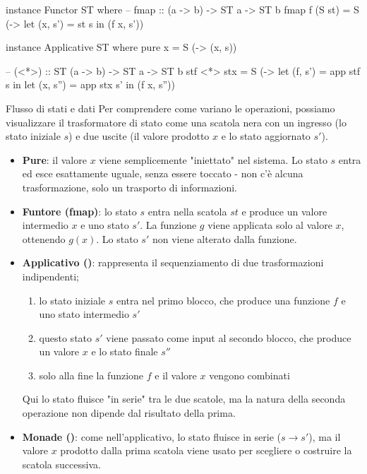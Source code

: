 \begin{haskellbox}{}
instance Functor ST where
    -- fmap :: (a -> b) -> ST a -> ST b
    fmap f (S st) = S (\s -> 
        let (x, s') = st s 
        in (f x, s'))
\end{haskellbox}

\begin{haskellbox}{}
instance Applicative ST where
    pure x = S (\s -> (x, s))

    -- (<*>) :: ST (a -> b) -> ST a -> ST b
    stf <*> stx = S (\s ->
        let (f, s')  = app stf s in
        let (x, s'') = app stx s' in
        (f x, s''))
\end{haskellbox}

\begin{gframe}{Flusso di stati e dati}
Per comprendere come variano le operazioni, possiamo visualizzare il trasformatore di stato come una scatola nera con un ingresso (lo stato iniziale $s$) e due uscite (il valore prodotto $x$ e lo stato aggiornato $s'$).

\begin{itemize}
    \item \textbf{Pure}: il valore $x$ viene semplicemente "iniettato" nel sistema. Lo stato $s$ entra ed esce esattamente uguale, senza essere toccato - non c'è alcuna trasformazione, solo un trasporto di informazioni.
    
    \item \textbf{Funtore (fmap)}: lo stato $s$ entra nella scatola $st$ e produce un valore intermedio $x$ e uno stato $s'$. La funzione $g$ viene applicata solo al valore $x$, ottenendo $g(x)$. Lo stato $s'$ non viene alterato dalla funzione.

    \item \textbf{Applicativo (\code{<*>})}: rappresenta il sequenziamento di due trasformazioni indipendenti;
    \begin{enumerate}
        \item lo stato iniziale $s$ entra nel primo blocco, che produce una funzione $f$ e uno stato intermedio $s'$
        \item questo stato $s'$ viene passato come input al secondo blocco, che produce un valore $x$ e lo stato finale $s''$
        \item solo alla fine la funzione $f$ e il valore $x$ vengono combinati
    \end{enumerate}
    Qui lo stato fluisce "in serie" tra le due scatole, ma la natura della seconda operazione non dipende dal risultato della prima.

\item \textbf{Monade (\code{>>=})}: come nell'applicativo, lo stato fluisce in serie ($s \to s'$), ma il valore $x$ prodotto dalla prima scatola viene usato per scegliere o costruire la scatola successiva.
\end{itemize}

\end{gframe}

